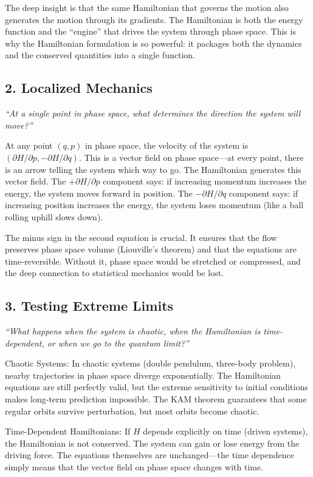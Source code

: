 \documentclass[11pt,openright]{book}
\begin{document}
The deep insight is that the same Hamiltonian that governs the motion also generates the motion through its gradients. The Hamiltonian is both the energy function and the ``engine'' that drives the system through phase space. This is why the Hamiltonian formulation is so powerful: it packages both the dynamics and the conserved quantities into a single function.

\subsection*{2. Localized Mechanics}
\textit{``At a single point in phase space, what determines the direction the system will move?''}

At any point $(q, p)$ in phase space, the velocity of the system is $(\partial H/\partial p, -\partial H/\partial q)$. This is a vector field on phase space---at every point, there is an arrow telling the system which way to go. The Hamiltonian generates this vector field. The $+\partial H/\partial p$ component says: if increasing momentum increases the energy, the system moves forward in position. The $-\partial H/\partial q$ component says: if increasing position increases the energy, the system loses momentum (like a ball rolling uphill slows down).

The minus sign in the second equation is crucial. It ensures that the flow preserves phase space volume (Liouville's theorem) and that the equations are time-reversible. Without it, phase space would be stretched or compressed, and the deep connection to statistical mechanics would be lost.

\subsection*{3. Testing Extreme Limits}
\textit{``What happens when the system is chaotic, when the Hamiltonian is time-dependent, or when we go to the quantum limit?''}

Chaotic Systems: In chaotic systems (double pendulum, three-body problem), nearby trajectories in phase space diverge exponentially. The Hamiltonian equations are still perfectly valid, but the extreme sensitivity to initial conditions makes long-term prediction impossible. The KAM theorem guarantees that some regular orbits survive perturbation, but most orbits become chaotic.

Time-Dependent Hamiltonians: If $H$ depends explicitly on time (driven systems), the Hamiltonian is not conserved. The system can gain or lose energy from the driving force. The equations themselves are unchanged---the time dependence simply means that the vector field on phase space changes with time.
\end{document}
